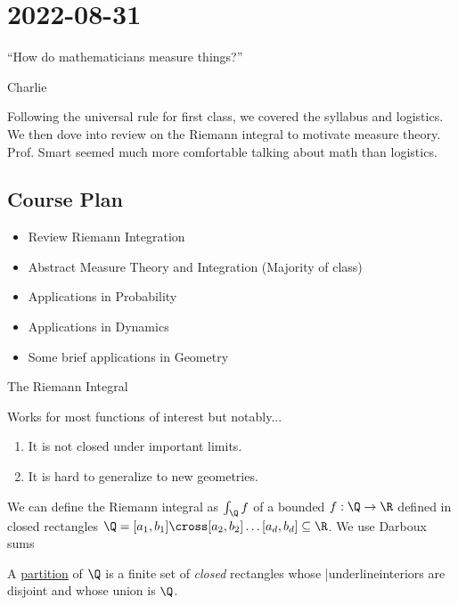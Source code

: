 \section{2022-08-31}

\epigraph{``How do mathematicians measure things?''}{Charlie}

Following the universal rule for first class, we covered the syllabus and logistics. We then dove into review on the Riemann integral to motivate measure theory. Prof. Smart seemed much more comfortable talking about math than logistics.

\subsection{Course Plan}
\begin{itemize}
	\item Review Riemann Integration
	\item Abstract Measure Theory and Integration (Majority of class)
	\item Applications in Probability
	\item Applications in Dynamics
	\item Some brief applications in Geometry
\end{itemize}

\begin{problem} The Riemann Integral
\item Works for most functions of interest but notably...
	\begin{enumerate}
		\item It is not closed under important limits. 
		\item It is hard to generalize to new geometries.
	\end{enumerate}
\end{problem}

\begin{definition}
	We can define the Riemann integral as $\int_{{\Q}}^{{}} {f}$ of a bounded $f : \Q \to \R$
	defined in closed rectangles
	$\Q = [a_1,b_1] \cross [a_2,b_2] \ldots [a_d,b_d] \subseteq \R$. We use Darboux sums
\end{definition}

\vline
\begin{definition}[partition]
	A \underline{partition} of $\Q$	is a finite set of \emph{closed} rectangles whose |underline{interiors} are disjoint and whose union is $\Q$.
\end{definition}

